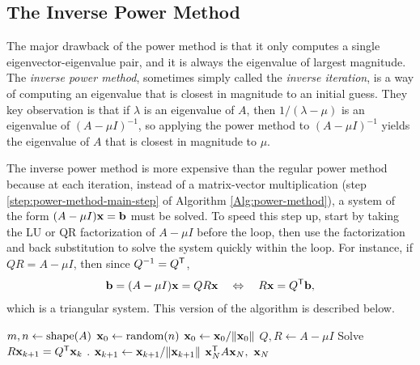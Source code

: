 \subsection*{The Inverse Power Method} %

The major drawback of the power method is that it only computes a single eigenvector-eigenvalue pair, and it is always the eigenvalue of largest magnitude.
The \emph{inverse power method}, sometimes simply called the \emph{inverse iteration}, is a way of computing an eigenvalue that is closest in magnitude to an initial guess.
They key observation is that if $\lambda$ is an eigenvalue of $A$, then $1/(\lambda - \mu)$ is an eigenvalue of $(A - \mu I)^{-1}$, so applying the power method to $(A - \mu I)^{-1}$ yields the eigenvalue of $A$ that is closest in magnitude to $\mu$.

The inverse power method is more expensive than the regular power method because at each iteration, instead of a matrix-vector multiplication (step \ref{step:power-method-main-step} of Algorithm \ref{Alg:power-method}), a system of the form $(A - \mu I)\mathbf{x} = \mathbf{b}$ must be solved.
To speed this step up, start by taking the LU or QR factorization of $A - \mu I$ before the loop, then use the factorization and back substitution to solve the system quickly within the loop.
For instance, if $QR = A - \mu I$, then since $Q^{-1} = Q^{\mathsf T}$,
\begin{align*}
    \mathbf{b}
    = (A-\mu I)\mathbf{x}
    = QR\mathbf{x}
    \quad\Leftrightarrow\quad
    R\mathbf{x} = Q^{\mathsf T}\mathbf{b},
\end{align*}
which is a triangular system.
This version of the algorithm is described below.

\begin{algorithm}[H] %
\begin{algorithmic}[1]
    \State $m, n \gets \mathrm{shape}(A)$
    \State $\mathbf{x}_0 \gets \mbox{random}(n)$
    \State $\mathbf{x}_0 \gets \mathbf{x}_0/\|\mathbf{x}_0\|$
    \State $Q,R \gets A-\mu I$
        \State Solve $R\mathbf{x}_{k+1} = Q^{\mathsf T}\mathbf{x}_{k}$
            .
        \State $\mathbf{x}_{k+1} \gets \mathbf{x}_{k+1}/\|\mathbf{x}_{k+1}\|$
    \EndFor
    \State {} $\mathbf{x}_N^{\mathsf T} A \mathbf{x}_N,\ \mathbf{x}_N$
\EndProcedure
\end{algorithmic}
\caption{}
\label{Alg:inverse-power-method}
\end{algorithm}

